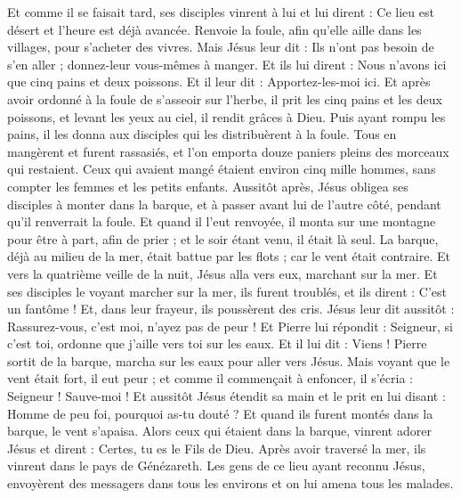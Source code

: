 \begin{multicols}{2}
Et comme il se faisait tard, ses disciples vinrent à lui et lui dirent : Ce lieu est désert et l'heure est déjà avancée. Renvoie la foule, afin qu'elle aille dans les villages, pour s'acheter des vivres.
Mais Jésus leur dit : Ils n'ont pas besoin de s'en aller ; donnez-leur vous-mêmes à manger.
Et ils lui dirent : Nous n'avons ici que cinq pains et deux poissons.
Et il leur dit : Apportez-les-moi ici.
Et après avoir ordonné à la foule de s'asseoir sur l'herbe, il prit les cinq pains et les deux poissons, et levant les yeux au ciel, il rendit grâces à Dieu. Puis ayant rompu les pains, il les donna aux disciples qui les distribuèrent à la foule.
Tous en mangèrent et furent rassasiés, et l'on emporta douze paniers pleins des morceaux qui restaient.
Ceux qui avaient mangé étaient environ cinq mille hommes, sans compter les femmes et les petits enfants.
Aussitôt après, Jésus obligea ses disciples à monter dans la barque, et à passer avant lui de l'autre côté, pendant qu'il renverrait la foule.
Et quand il l'eut renvoyée, il monta sur une montagne pour être à part, afin de prier ; et le soir étant venu, il était là seul.
La barque, déjà au milieu de la mer, était battue par les flots ; car le vent était contraire.
Et vers la quatrième veille de la nuit, Jésus alla vers eux, marchant sur la mer.
Et ses disciples le voyant marcher sur la mer, ils furent troublés, et ils dirent : C'est un fantôme ! Et, dans leur frayeur, ils poussèrent des cris.
Jésus leur dit aussitôt : Rassurez-vous, c'est moi, n'ayez pas de peur !
Et Pierre lui répondit : Seigneur, si c'est toi, ordonne que j'aille vers toi sur les eaux.
Et il lui dit : Viens ! Pierre sortit de la barque, marcha sur les eaux pour aller vers Jésus.
Mais voyant que le vent était fort, il eut peur ; et comme il commençait à enfoncer, il s'écria : Seigneur ! Sauve-moi !
Et aussitôt Jésus étendit sa main et le prit en lui disant : Homme de peu foi, pourquoi as-tu douté ?
Et quand ils furent montés dans la barque, le vent s'apaisa.
Alors ceux qui étaient dans la barque, vinrent adorer Jésus et dirent : Certes, tu es le Fils de Dieu.
Après avoir traversé la mer, ils vinrent dans le pays de Génézareth.
Les gens de ce lieu ayant reconnu Jésus, envoyèrent des messagers dans tous les environs et on lui amena tous les malades.

\end{multicols}
